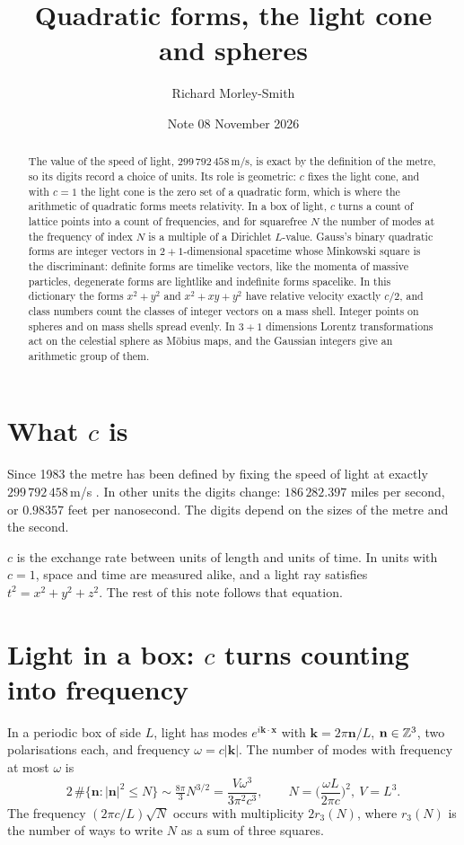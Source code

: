 \documentclass[11pt]{article}
\title{Quadratic forms, the light cone and spheres}
\author{Richard Morley-Smith}
\date{Note 08 \quad November 2026}
\begin{document}
\maketitle

\begin{abstract}
\noindent
The value of the speed of light, $299\,792\,458$\,m/s, is exact by the definition of the metre, so its digits record a choice of units.
Its role is geometric: $c$ fixes the light cone, and with $c=1$ the light cone is the zero set of a quadratic form, which is where the arithmetic of quadratic forms meets relativity.
In a box of light, $c$ turns a count of lattice points into a count of frequencies, and for squarefree $N$ the number of modes at the frequency of index $N$ is a multiple of a Dirichlet $L$-value.
Gauss's binary quadratic forms are integer vectors in $2+1$-dimensional spacetime whose Minkowski square is the discriminant: definite forms are timelike vectors, like the momenta of massive particles, degenerate forms are lightlike and indefinite forms spacelike.
In this dictionary the forms $x^2+y^2$ and $x^2+xy+y^2$ have relative velocity exactly $c/2$, and class numbers count the classes of integer vectors on a mass shell.
Integer points on spheres and on mass shells spread evenly.
In $3+1$ dimensions Lorentz transformations act on the celestial sphere as M\"obius maps, and the Gaussian integers give an arithmetic group of them.
\end{abstract}

\section{What $c$ is}

Since 1983 the metre has been defined by fixing the speed of light at exactly $299\,792\,458$\,m/s \cite{SI}.
In other units the digits change: $186\,282.397$ miles per second, or $0.98357$ feet per nanosecond.
The digits depend on the sizes of the metre and the second.

\physical
$c$ is the exchange rate between units of length and units of time.
In units with $c=1$, space and time are measured alike, and a light ray satisfies $t^2 = x^2+y^2+z^2$.
The rest of this note follows that equation.

\section{Light in a box: $c$ turns counting into frequency}

\begin{derivation}\label{d:planck}
In a periodic box of side $L$, light has modes $e^{i\mathbf k\cdot\mathbf x}$ with $\mathbf k = 2\pi\mathbf n/L$, $\mathbf n\in\mathbb{Z}^3$, two polarisations each, and frequency $\omega = c|\mathbf k|$.
The number of modes with frequency at most $\omega$ is
\[
  2\,\#\{\mathbf n: |\mathbf n|^2\le N\} \sim \tfrac{8\pi}{3}N^{3/2} = \frac{V\omega^3}{3\pi^2c^3},\qquad N = \Big(\frac{\omega L}{2\pi c}\Big)^2,\ V = L^3.
\]
The frequency $(2\pi c/L)\sqrt N$ occurs with multiplicity $2r_3(N)$, where $r_3(N)$ is the number of ways to write $N$ as a sum of three squares.
\end{derivation}
\end{document}
